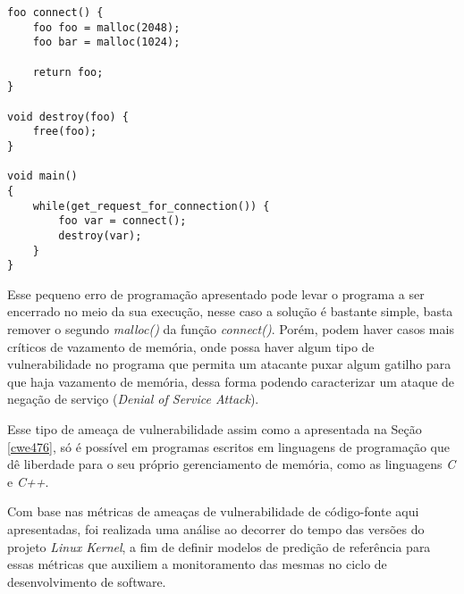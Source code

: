 \begin{lstlisting}[caption={Código exemplo CWE401}, label=codigoCWE401]
foo connect() {
    foo foo = malloc(2048);
    foo bar = malloc(1024);

    return foo;
}

void destroy(foo) {
    free(foo);
}

void main()
{
    while(get_request_for_connection()) {
        foo var = connect();
        destroy(var);
    }
}
\end{lstlisting}

Esse pequeno erro de programação apresentado pode levar o programa a ser
encerrado no meio da sua execução, nesse caso a solução é bastante simple,
basta remover o segundo \textit{malloc()} da função \textit{connect()}. Porém,
podem haver casos mais críticos de vazamento de memória, onde possa haver algum
tipo de vulnerabilidade no programa que permita um atacante puxar algum gatilho
para que haja vazamento de memória, dessa forma podendo caracterizar um ataque
de negação de serviço (\textit{Denial of Service Attack}).

Esse tipo de ameaça de vulnerabilidade assim como a apresentada na Seção
\ref{cwe476}, só é possível em programas escritos em linguagens de programação
que dê liberdade para o seu próprio gerenciamento de memória, como as linguagens
\textit{C} e \textit{C++}.



Com base nas métricas de ameaças de vulnerabilidade de código-fonte aqui
apresentadas, foi realizada uma análise ao decorrer do tempo das versões do
projeto \textit{Linux Kernel}, a fim de definir modelos de predição de
referência para essas métricas que auxiliem a monitoramento das mesmas no ciclo
de desenvolvimento de software.


